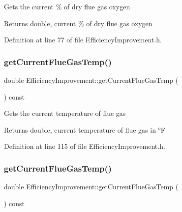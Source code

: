 Gets the current \% of dry flue gas oxygen

\begin{DoxyReturn}{Returns}
double, current \% of dry flue gas oxygen 
\end{DoxyReturn}


Definition at line 77 of file Efficiency\+Improvement.\+h.

\mbox{\label{class_efficiency_improvement_a27e97b5c7aad8aa6b4d02e18354d2292}} 
\subsubsection{\texorpdfstring{get\+Current\+Flue\+Gas\+Temp()}{getCurrentFlueGasTemp()}\hspace{0.1cm}{\footnotesize\ttfamily [1/3]}}
{\footnotesize\ttfamily double Efficiency\+Improvement\+::get\+Current\+Flue\+Gas\+Temp (\begin{DoxyParamCaption}{ }\end{DoxyParamCaption}) const\hspace{0.3cm}{\ttfamily [inline]}}

Gets the current temperature of flue gas

\begin{DoxyReturn}{Returns}
double, current temperature of flue gas in °F 
\end{DoxyReturn}


Definition at line 115 of file Efficiency\+Improvement.\+h.

\mbox{\label{class_efficiency_improvement_a27e97b5c7aad8aa6b4d02e18354d2292}} 
\subsubsection{\texorpdfstring{get\+Current\+Flue\+Gas\+Temp()}{getCurrentFlueGasTemp()}\hspace{0.1cm}{\footnotesize\ttfamily [2/3]}}
{\footnotesize\ttfamily double Efficiency\+Improvement\+::get\+Current\+Flue\+Gas\+Temp (\begin{DoxyParamCaption}{ }\end{DoxyParamCaption}) const\hspace{0.3cm}{\ttfamily [inline]}}

